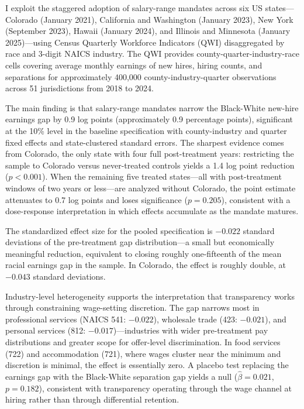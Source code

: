 \documentclass[12pt]{article}
\begin{document}
I exploit the staggered adoption of salary-range mandates across six US states---Colorado (January 2021), California and Washington (January 2023), New York (September 2023), Hawaii (January 2024), and Illinois and Minnesota (January 2025)---using Census Quarterly Workforce Indicators (QWI) disaggregated by race and 3-digit NAICS industry. The QWI provides county-quarter-industry-race cells covering average monthly earnings of new hires, hiring counts, and separations for approximately 400,000 county-industry-quarter observations across 51 jurisdictions from 2018 to 2024.

The main finding is that salary-range mandates narrow the Black-White new-hire earnings gap by 0.9 log points (approximately 0.9 percentage points), significant at the 10\% level in the baseline specification with county-industry and quarter fixed effects and state-clustered standard errors. The sharpest evidence comes from Colorado, the only state with four full post-treatment years: restricting the sample to Colorado versus never-treated controls yields a 1.4 log point reduction ($p < 0.001$). When the remaining five treated states---all with post-treatment windows of two years or less---are analyzed without Colorado, the point estimate attenuates to 0.7 log points and loses significance ($p = 0.205$), consistent with a dose-response interpretation in which effects accumulate as the mandate matures.

The standardized effect size for the pooled specification is $-0.022$ standard deviations of the pre-treatment gap distribution---a small but economically meaningful reduction, equivalent to closing roughly one-fifteenth of the mean racial earnings gap in the sample. In Colorado, the effect is roughly double, at $-0.043$ standard deviations.

Industry-level heterogeneity supports the interpretation that transparency works through constraining wage-setting discretion. The gap narrows most in professional services (NAICS 541: $-0.022$), wholesale trade (423: $-0.021$), and personal services (812: $-0.017$)---industries with wider pre-treatment pay distributions and greater scope for offer-level discrimination. In food services (722) and accommodation (721), where wages cluster near the minimum and discretion is minimal, the effect is essentially zero. A placebo test replacing the earnings gap with the Black-White separation gap yields a null ($\hat{\beta} = 0.021$, $p = 0.182$), consistent with transparency operating through the wage channel at hiring rather than through differential retention.
\end{document}
